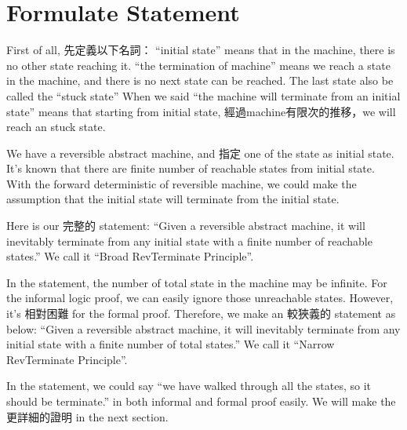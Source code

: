 \section{Formulate Statement}

First of all, 先定義以下名詞：
``initial state'' means that in the machine, there is no other state reaching it.
``the termination of machine'' means we reach a state in the machine, and there is no next state can be reached.  The last state also be called the ``stuck state''
When we said ``the machine will terminate from an initial state'' means that starting from initial state, 經過machine有限次的推移，we will reach an stuck state.

We have a reversible abstract machine, and 指定 one of the state as initial state.  
It's known that there are finite number of reachable states from initial state.  
With the forward deterministic of reversible machine, we could make the assumption that the initial state will terminate from the initial state.

Here is our 完整的 statement:
``Given a reversible abstract machine, it will inevitably terminate from any initial state with a finite number of reachable states.''
We call it ``Broad RevTerminate Principle''.

In the statement, the number of total state in the machine may be infinite.
For the informal logic proof, we can easily ignore those unreachable states.  However, it's 相對困難 for the formal proof.
Therefore, we make an 較狹義的 statement as below:
``Given a reversible abstract machine, it will inevitably terminate from any initial state with a finite number of total states.''
We call it ``Narrow RevTerminate Principle''.

In the statement, we could say ``we have walked through all the states, so it should be terminate.'' in both informal and formal proof easily.
We will make the 更詳細的證明 in the next section.